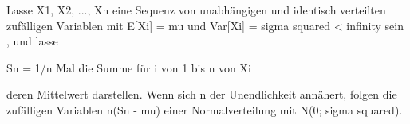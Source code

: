\documentclass{article}
\begin{document}

Lasse X1, X2, ..., Xn eine Sequenz von unabhängigen und 
identisch verteilten zufälligen Variablen mit  E[Xi] = mu und
Var[Xi] = sigma squared < infinity sein , und lasse

Sn = 1/n Mal die Summe für i von 1 bis n von Xi

deren Mittelwert darstellen. Wenn sich n der Unendlichkeit annähert, folgen die zufälligen Variablen 
n(Sn - mu) einer Normalverteilung mit N(0; sigma squared).
\end{document}
